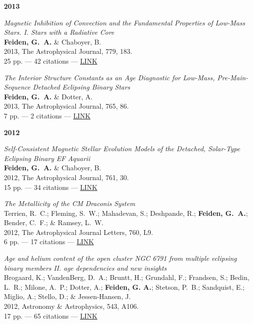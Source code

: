 \documentclass[11pt,a4paper]{article}
\begin{document}
\begin{etaremune}[leftmargin=0.4in]
	\item[{\bf 2013}]

	\item {\it Magnetic Inhibition of Convection and the Fundamental Properties of Low-Mass Stars. I. Stars with a Radiative Core} \\
          {\bf Feiden, G.~A.} \& Chaboyer, B. \\
          2013, The Astrophysical Journal, 779, 183. \\
          25 pp. --- 42 citations --- \href{http://adsabs.harvard.edu/abs/2013ApJ...779..183F/}{LINK}

    \item {\it The Interior Structure Constants as an Age Diagnostic for Low-Mass, Pre-Main-Sequence Detached Eclipsing Binary Stars} \\
          {\bf Feiden, G.~A.} \& Dotter, A. \\
          2013, The Astrophysical Journal, 765, 86. \\
          7 pp. --- 2 citations --- \href{http://adsabs.harvard.edu/abs/2013ApJ...765...86F}{LINK}
          
    \item[{\bf 2012}]
    
    \item {\it Self-Consistent Magnetic Stellar Evolution Models of the Detached, Solar-Type Eclipsing Binary EF Aquarii} \\
          {\bf Feiden, G.~A.} \& Chaboyer, B. \\
          2012, The Astrophysical Journal, 761, 30. \\
          15 pp. --- 34 citations --- \href{http://adsabs.harvard.edu/abs/2012ApJ...761...30F}{LINK}
          
    \item {\it The Metallicity of the CM Draconis System} \\
          Terrien, R.~C.; Fleming, S.~W.; Mahadevan, S.; Deshpande, R.; {\bf Feiden, G.~A.}; Bender, C.~F.; \& Ramsey, L.~W. \\
          2012, The Astrophysical Journal Letters, 760, L9. \\ 
          6 pp. --- 17 citations --- \href{http://adsabs.harvard.edu/abs/2012ApJ...760L...9T}{LINK}
          
    \item {\it Age and helium content of the open cluster NGC 6791 from multiple eclipsing binary members II. age dependencies and new insights} \\
          Brogaard, K.; VandenBerg, D.~A.; Bruntt, H.;  Grundahl, F.; Frandsen, S.; Bedin, L.~R.; Milone, A.~P.; Dotter, A.; {\bf Feiden, G. A.}; Stetson, P.~B.; Sandquist, E.; Miglio, A.; Stello, D.; \& Jessen-Hansen, J. \\
          2012, Astronomy \& Astrophysics, 543, A106. \\
          17 pp. --- 65 citations --- \href{http://adsabs.harvard.edu/abs/2012A&A...380A.106B}{LINK}
          

\end{etaremune}
\end{document}

